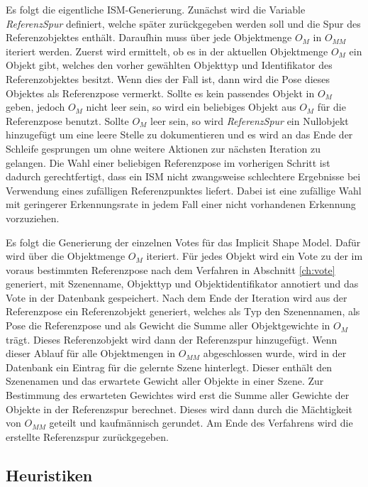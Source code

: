 Es folgt die eigentliche ISM-Generierung.
Zunächst wird die Variable \textit{ReferenzSpur} definiert, welche später zurückgegeben werden soll und die Spur des Referenzobjektes enthält.
Daraufhin muss über jede Objektmenge $O_M$ in $O_{MM}$ iteriert werden.
Zuerst wird ermittelt, ob es in der aktuellen Objektmenge $O_M$ ein Objekt gibt, welches den vorher gewählten Objekttyp und Identifikator des Referenzobjektes besitzt.
Wenn dies der Fall ist, dann wird die Pose dieses Objektes als Referenzpose vermerkt.
Sollte es kein passendes Objekt in $O_M$ geben, jedoch $O_M$ nicht leer sein, so wird ein beliebiges Objekt aus $O_M$ für die Referenzpose benutzt.
Sollte $O_M$ leer sein, so wird \textit{ReferenzSpur} ein Nullobjekt hinzugefügt um eine leere Stelle zu dokumentieren und es wird an das Ende der Schleife gesprungen um ohne weitere Aktionen zur nächsten Iteration zu gelangen.
Die Wahl einer beliebigen Referenzpose im vorherigen Schritt ist dadurch gerechtfertigt, dass ein ISM nicht zwangsweise schlechtere Ergebnisse bei Verwendung eines zufälligen Referenzpunktes liefert.
Dabei ist eine zufällige Wahl mit geringerer Erkennungsrate in jedem Fall einer nicht vorhandenen Erkennung vorzuziehen.

Es folgt die Generierung der einzelnen Votes für das Implicit Shape Model.
Dafür wird über die Objektmenge $O_M$ iteriert.
Für jedes Objekt wird ein Vote zu der im voraus bestimmten Referenzpose nach dem Verfahren in Abschnitt \vref{ch:vote} generiert, mit Szenenname, Objekttyp und Objektidentifikator annotiert und das Vote in der Datenbank gespeichert.
Nach dem Ende der Iteration wird aus der Referenzpose ein Referenzobjekt generiert, welches als Typ den Szenennamen, als Pose die Referenzpose und als Gewicht die Summe aller Objektgewichte in $O_M$ trägt.
Dieses Referenzobjekt wird dann der Referenzspur hinzugefügt.
Wenn dieser Ablauf für alle Objektmengen in $O_{MM}$ abgeschlossen wurde, wird in der Datenbank ein Eintrag für die gelernte Szene hinterlegt.
Dieser enthält den Szenenamen und das erwartete Gewicht aller Objekte in einer Szene.
Zur Bestimmung des erwarteten Gewichtes wird erst die Summe aller Gewichte der Objekte in der Referenzspur berechnet.
Dieses wird dann durch die Mächtigkeit von $O_{MM}$ geteilt und kaufmännisch gerundet.
Am Ende des Verfahrens wird die erstellte Referenzspur zurückgegeben.

\subsection{Heuristiken}

